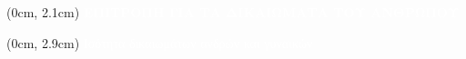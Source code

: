 \documentclass[aspectratio=3219]{beamer}
\begin{document}
{
\begin{frame}

\begin{textblock*}{\pdfpagewidth}(0cm, 2.1cm)
    \centering
    \textbf{\textcolor{white}{\large ΕΠΙΤΡΟΠΗ ΓΙΑ ΤΑ ΔΙΚΑΙΩΜΑΤΑ ΤΟΥ ΑΝΘΡΩΠΟΥ}}
\end{textblock*}

\begin{textblock*}{\pdfpagewidth}(0cm, 2.9cm)
    \centering
    \textcolor{white}{\normalsize Ισότητα δικαιωμάτων ανδρών και γυναικών}
\end{textblock*}

\end{frame}}
\end{document}
